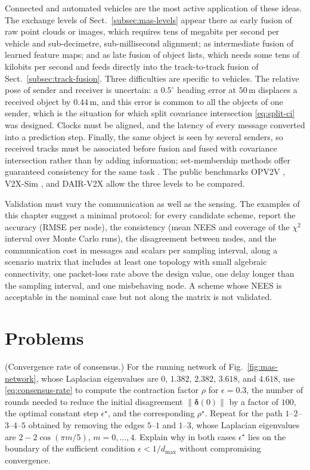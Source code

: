 \documentclass[graybox,envcountchap]{style/SNmono}
\newcommand{\problemsection}{\section*{Problems}\addcontentsline{toc}{section}{Problems}}
\begin{document}
Connected and automated vehicles are the most active application of these ideas. The exchange levels of Sect.~\ref{subsec:mas-levels} appear there as early fusion of raw point clouds or images, which requires tens of megabits per second per vehicle and sub-decimetre, sub-millisecond alignment; as intermediate fusion of learned feature maps; and as late fusion of object lists, which needs some tens of kilobits per second and feeds directly into the track-to-track fusion of Sect.~\ref{subsec:track-fusion}. Three difficulties are specific to vehicles. The relative pose of sender and receiver is uncertain: a $0.5^{\circ}$ heading error at $50$\,m displaces a received object by $0.44$\,m, and this error is common to all the objects of one sender, which is the situation for which split covariance intersection \eqref{eq:split-ci} was designed. Clocks must be aligned, and the latency of every message converted into a prediction step. Finally, the same object is seen by several senders, so received tracks must be associated before fusion and fused with covariance intersection rather than by adding information; set-membership methods offer guaranteed consistency for the same task \cite{narri2021_set_membership_shared_awareness,narri2025_set_based_awareness}. The public benchmarks OPV2V \cite{xu2022_opv2v}, V2X-Sim \cite{li2022_v2xsim}, and DAIR-V2X \cite{yu2022_dairv2x} allow the three levels to be compared.

Validation must vary the communication as well as the sensing. The examples of this chapter suggest a minimal protocol: for every candidate scheme, report the accuracy (RMSE per node), the consistency (mean NEES and coverage of the $\chi^{2}$ interval over Monte Carlo runs), the disagreement between nodes, and the communication cost in messages and scalars per sampling interval, along a scenario matrix that includes at least one topology with small algebraic connectivity, one packet-loss rate above the design value, one delay longer than the sampling interval, and one misbehaving node. A scheme whose NEES is acceptable in the nominal case but not along the matrix is not validated.

\problemsection

\begin{prob}\label{prob:ch06:1}
(Convergence rate of consensus.) For the running network of Fig.~\ref{fig:mas-network}, whose Laplacian eigenvalues are $0$, $1.382$, $2.382$, $3.618$, and $4.618$, use \eqref{eq:consensus-rate} to compute the contraction factor $\rho$ for $\epsilon=0.3$, the number of rounds needed to reduce the initial disagreement $\|\boldsymbol{\delta}(0)\|$ by a factor of $100$, the optimal constant step $\epsilon^{\star}$, and the corresponding $\rho^{\star}$. Repeat for the path $1$--$2$--$3$--$4$--$5$ obtained by removing the edges $5$--$1$ and $1$--$3$, whose Laplacian eigenvalues are $2-2\cos(\pi m/5)$, $m=0,\dots,4$. Explain why in both cases $\epsilon^{\star}$ lies on the boundary of the sufficient condition $\epsilon<1/d_{\max}$ without compromising convergence.
\end{prob}
\end{document}
